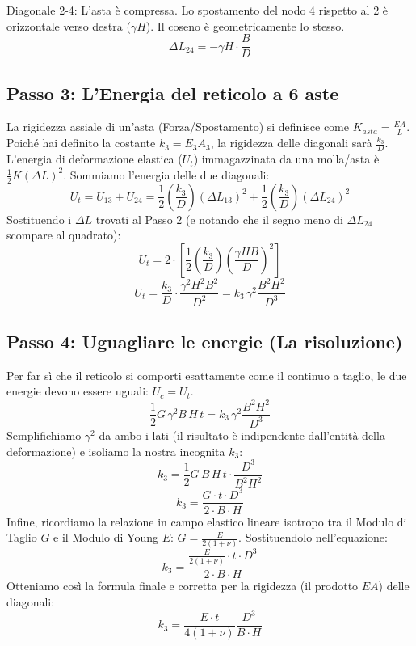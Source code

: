 \documentclass[a4paper]{article}
\begin{document}

Diagonale 2-4: L'asta è compressa. Lo spostamento del nodo 4 rispetto al 2 è orizzontale verso destra ($\gamma H$). Il coseno è geometricamente lo stesso.
$$\Delta L_{24} = -\gamma H \cdot \frac{B}{D}$$
\subsection{Passo 3: L'Energia del reticolo a 6 aste}
La rigidezza assiale di un'asta (Forza/Spostamento) si definisce come $K_{asta} = \frac{EA}{L}$. Poiché hai definito la costante $k_3 = E_3 A_3$, la rigidezza delle diagonali sarà $\frac{k_3}{D}$.
L'energia di deformazione elastica ($U_t$) immagazzinata da una molla/asta è $\frac{1}{2} K (\Delta L)^2$. Sommiamo l'energia delle due diagonali:
$$U_t = U_{13} + U_{24} = \frac{1}{2} \left( \frac{k_3}{D} \right) (\Delta L_{13})^2 + \frac{1}{2} \left( \frac{k_3}{D} \right) (\Delta L_{24})^2$$
Sostituendo i $\Delta L$ trovati al Passo 2 (e notando che il segno meno di $\Delta L_{24}$ scompare al quadrato):
$$U_t = 2 \cdot \left[ \frac{1}{2} \left( \frac{k_3}{D} \right) \left( \frac{\gamma H B}{D} \right)^2 \right]$$
$$U_t = \frac{k_3}{D} \cdot \frac{\gamma^2 H^2 B^2}{D^2} = k_3 \, \gamma^2 \frac{B^2 H^2}{D^3}$$
\subsection{Passo 4: Uguagliare le energie (La risoluzione)}
Per far sì che il reticolo si comporti esattamente come il continuo a taglio, le due energie devono essere uguali: $U_c = U_t$.
$$\frac{1}{2} G \, \gamma^2 B \, H \, t = k_3 \, \gamma^2 \frac{B^2 H^2}{D^3}$$
Semplifichiamo $\gamma^2$ da ambo i lati (il risultato è indipendente dall'entità della deformazione) e isoliamo la nostra incognita $k_3$:
$$k_3 = \frac{1}{2} G \, B \, H \, t \cdot \frac{D^3}{B^2 H^2}$$
$$k_3 = \frac{G \cdot t \cdot D^3}{2 \cdot B \cdot H}$$
Infine, ricordiamo la relazione in campo elastico lineare isotropo tra il Modulo di Taglio $G$ e il Modulo di Young $E$: $G = \frac{E}{2(1+\nu)}$. Sostituendolo nell'equazione:
$$k_3 = \frac{\frac{E}{2(1+\nu)} \cdot t \cdot D^3}{2 \cdot B \cdot H}$$
Otteniamo così la formula finale e corretta per la rigidezza (il prodotto $EA$) delle diagonali:
$$k_3 = \frac{E \cdot t}{4(1+\nu)} \frac{D^3}{B \cdot H}$$
\end{document}
